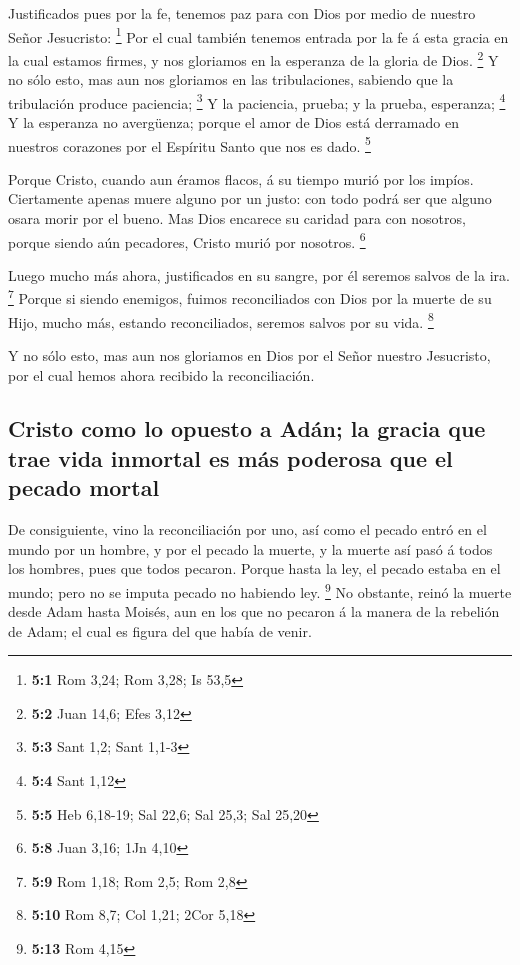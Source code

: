  Justificados pues por la fe, tenemos paz para con Dios por
medio de nuestro Señor Jesucristo: \footnote{\textbf{5:1} Rom 3,24; Rom
  3,28; Is 53,5}  Por el cual también tenemos entrada por la
fe á esta gracia en la cual estamos firmes, y nos gloriamos en la
esperanza de la gloria de Dios. \footnote{\textbf{5:2} Juan 14,6; Efes
  3,12}  Y no sólo esto, mas aun nos gloriamos en las
tribulaciones, sabiendo que la tribulación produce paciencia;
\footnote{\textbf{5:3} Sant 1,2; Sant 1,1-3}  Y la
paciencia, prueba; y la prueba, esperanza; \footnote{\textbf{5:4} Sant
  1,12}  Y la esperanza no avergüenza; porque el amor de
Dios está derramado en nuestros corazones por el Espíritu Santo que nos
es dado. \footnote{\textbf{5:5} Heb 6,18-19; Sal 22,6; Sal 25,3; Sal
  25,20}

 Porque Cristo, cuando aun éramos flacos, á su tiempo murió
por los impíos.  Ciertamente apenas muere alguno por un
justo: con todo podrá ser que alguno osara morir por el bueno.
 Mas Dios encarece su caridad para con nosotros, porque
siendo aún pecadores, Cristo murió por nosotros. \footnote{\textbf{5:8}
  Juan 3,16; 1Jn 4,10}

 Luego mucho más ahora, justificados en su sangre, por él
seremos salvos de la ira. \footnote{\textbf{5:9} Rom 1,18; Rom 2,5; Rom
  2,8}  Porque si siendo enemigos, fuimos reconciliados con
Dios por la muerte de su Hijo, mucho más, estando reconciliados, seremos
salvos por su vida. \footnote{\textbf{5:10} Rom 8,7; Col 1,21; 2Cor 5,18}

 Y no sólo esto, mas aun nos gloriamos en Dios por el Señor
nuestro Jesucristo, por el cual hemos ahora recibido la reconciliación.

\hypertarget{cristo-como-lo-opuesto-a-aduxe1n-la-gracia-que-trae-vida-inmortal-es-muxe1s-poderosa-que-el-pecado-mortal}{%
\subsection{Cristo como lo opuesto a Adán; la gracia que trae vida
inmortal es más poderosa que el pecado
mortal}\label{cristo-como-lo-opuesto-a-aduxe1n-la-gracia-que-trae-vida-inmortal-es-muxe1s-poderosa-que-el-pecado-mortal}}

 De consiguiente, vino la reconciliación por uno, así como
el pecado entró en el mundo por un hombre, y por el pecado la muerte, y
la muerte así pasó á todos los hombres, pues que todos pecaron.
 Porque hasta la ley, el pecado estaba en el mundo; pero no
se imputa pecado no habiendo ley. \footnote{\textbf{5:13} Rom 4,15}
 No obstante, reinó la muerte desde Adam hasta Moisés, aun
en los que no pecaron á la manera de la rebelión de Adam; el cual es
figura del que había de venir.

